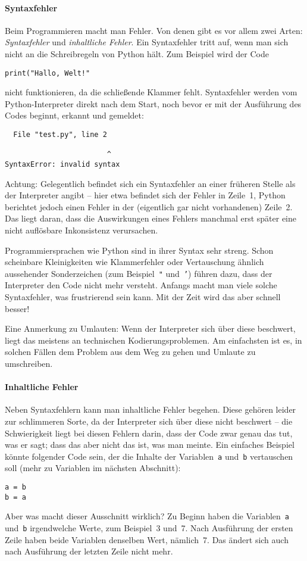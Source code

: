\documentclass{blatt}
\begin{document}
\paragraph{Syntaxfehler}
Beim Programmieren macht man Fehler. Von denen gibt es vor allem zwei Arten:
\emph{Syntaxfehler} und \emph{inhaltliche Fehler}. Ein Syntaxfehler tritt auf,
wenn man sich nicht an die Schreibregeln von Python hält. Zum Beispiel wird der
Code
\begin{verbatim}
print("Hallo, Welt!"
\end{verbatim}
nicht funktionieren, da die schließende Klammer fehlt. Syntaxfehler werden vom
Python-In\-ter\-pre\-ter direkt nach dem Start, noch bevor er mit der Ausführung des
Codes beginnt, erkannt und gemeldet:
\begin{verbatim}
  File "test.py", line 2

                        ^
SyntaxError: invalid syntax
\end{verbatim}
Achtung: Gelegentlich befindet sich ein Syntaxfehler an einer früheren Stelle
als der Interpreter angibt -- hier etwa befindet sich der Fehler in Zeile~1,
Python berichtet jedoch einen Fehler in der (eigentlich gar nicht vorhandenen)
Zeile~2. Das liegt daran, dass die Auswirkungen eines
Fehlers manchmal erst später eine nicht auflösbare Inkonsistenz verursachen.

Programmiersprachen wie Python sind in ihrer Syntax sehr streng. Schon
scheinbare Kleinigkeiten wie Klammerfehler oder Vertauschung ähnlich
aussehender Sonderzeichen (zum Beispiel~\texttt{"} und~\texttt{'}) führen
dazu, dass der Interpreter den Code nicht mehr versteht. Anfangs macht man
viele solche Syntaxfehler, was frustrierend sein kann. Mit der Zeit wird das
aber schnell besser!

Eine Anmerkung zu Umlauten: Wenn der Interpreter sich über diese beschwert,
liegt das meistens an technischen Kodierungsproblemen. Am einfachsten ist es,
in solchen Fällen dem Problem aus dem Weg zu gehen und Umlaute zu umschreiben.

\paragraph{Inhaltliche Fehler} Neben Syntaxfehlern kann man inhaltliche Fehler
begehen. Diese gehören leider zur schlimmeren Sorte, da der Interpreter sich
über diese nicht beschwert -- die Schwierigkeit liegt bei diesen Fehlern darin,
dass der Code zwar genau das tut, was er sagt; dass das aber nicht das ist, was
man meinte. Ein einfaches Beispiel könnte folgender Code sein, der die Inhalte
der Variablen~\texttt{a} und~\texttt{b} vertauschen soll (mehr zu Variablen im
nächsten Abschnitt):
\begin{verbatim}
a = b
b = a
\end{verbatim}
Aber was macht dieser Ausschnitt wirklich? Zu Beginn haben die
Variablen~\texttt{a} und~\texttt{b} irgendwelche Werte, zum Beispiel~3 und~7.
Nach Ausführung der ersten Zeile haben beide Variablen denselben Wert,
nämlich~7.  Das ändert sich auch nach Ausführung der letzten Zeile nicht mehr.
\end{document}
